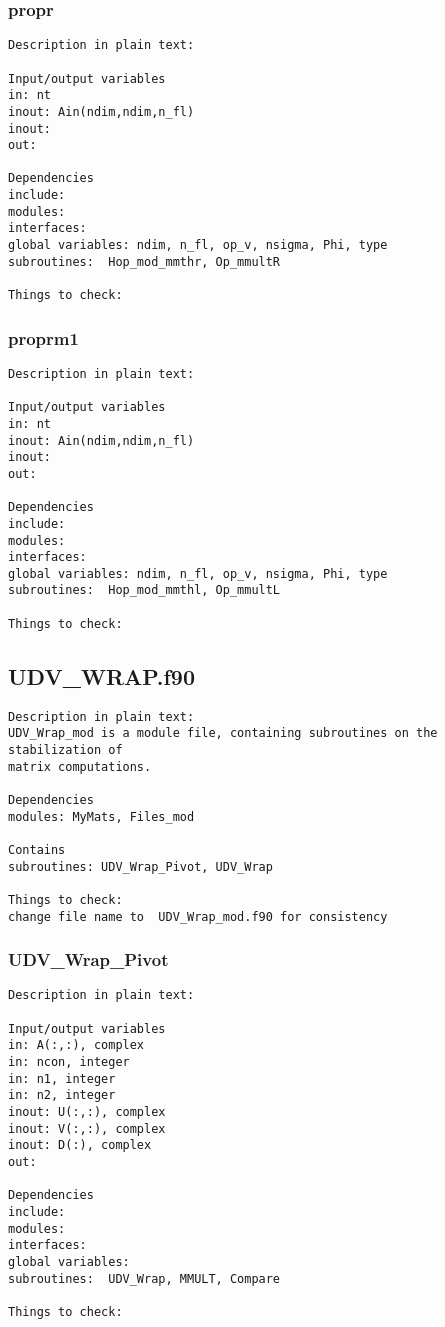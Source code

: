 \subsubsection{propr}
\begin{verbatim}
Description in plain text:

Input/output variables
in: nt
inout: Ain(ndim,ndim,n_fl)
inout: 
out:

Dependencies
include: 
modules: 
interfaces: 
global variables: ndim, n_fl, op_v, nsigma, Phi, type
subroutines:  Hop_mod_mmthr, Op_mmultR

Things to check:
\end{verbatim}

\subsubsection{proprm1}
\begin{verbatim}
Description in plain text:

Input/output variables
in: nt
inout: Ain(ndim,ndim,n_fl)
inout: 
out:

Dependencies
include: 
modules: 
interfaces: 
global variables: ndim, n_fl, op_v, nsigma, Phi, type
subroutines:  Hop_mod_mmthl, Op_mmultL

Things to check:
\end{verbatim}

\clearpage
\subsection{UDV\_WRAP.f90}
\begin{verbatim}
Description in plain text:
UDV_Wrap_mod is a module file, containing subroutines on the stabilization of 
matrix computations.

Dependencies
modules: MyMats, Files_mod

Contains
subroutines: UDV_Wrap_Pivot, UDV_Wrap

Things to check:
change file name to  UDV_Wrap_mod.f90 for consistency  
\end{verbatim}

\subsubsection{UDV\_Wrap\_Pivot}
\begin{verbatim}
Description in plain text:

Input/output variables
in: A(:,:), complex
in: ncon, integer
in: n1, integer
in: n2, integer
inout: U(:,:), complex
inout: V(:,:), complex
inout: D(:), complex
out:

Dependencies
include: 
modules: 
interfaces: 
global variables:  
subroutines:  UDV_Wrap, MMULT, Compare

Things to check:
\end{verbatim}

